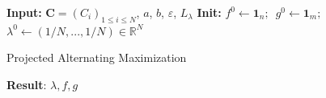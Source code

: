 \begin{algorithm}[ht!]
\SetAlgoLined
\textbf{Input:} $\mathbf{C}=(C_i)_{1\leq i\leq N}$, $a$, $b$, $\varepsilon$, $L_{\lambda}$
\textbf{Init:} $f^0\leftarrow \mathbf{1}_n\text{;  }$ $g^0 \leftarrow \mathbf{1}_m\text{;  }$ $\lambda^0 \leftarrow (1/N,...,1/N)\in\mathbb{R}^N$
\caption{Projected Alternating Maximization \label{algo:Proj-Sinkhorn}}
\textbf{Result}: $\lambda,f,g$
\end{algorithm}

